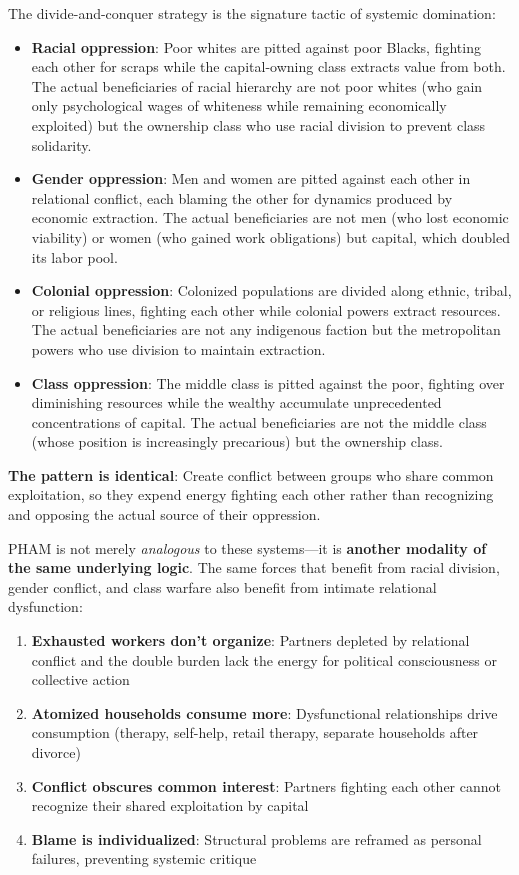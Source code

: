 \documentclass[12pt,openany]{book}
\numberwithin{equation}{chapter}
\begin{document}
The divide-and-conquer strategy is the signature tactic of systemic domination:

\begin{itemize}
    \item \textbf{Racial oppression}: Poor whites are pitted against poor Blacks, fighting each other for scraps while the capital-owning class extracts value from both. The actual beneficiaries of racial hierarchy are not poor whites (who gain only psychological wages of whiteness while remaining economically exploited) but the ownership class who use racial division to prevent class solidarity.
    
    \item \textbf{Gender oppression}: Men and women are pitted against each other in relational conflict, each blaming the other for dynamics produced by economic extraction. The actual beneficiaries are not men (who lost economic viability) or women (who gained work obligations) but capital, which doubled its labor pool.
    
    \item \textbf{Colonial oppression}: Colonized populations are divided along ethnic, tribal, or religious lines, fighting each other while colonial powers extract resources. The actual beneficiaries are not any indigenous faction but the metropolitan powers who use division to maintain extraction.
    
    \item \textbf{Class oppression}: The middle class is pitted against the poor, fighting over diminishing resources while the wealthy accumulate unprecedented concentrations of capital. The actual beneficiaries are not the middle class (whose position is increasingly precarious) but the ownership class.
\end{itemize}

\textbf{The pattern is identical}: Create conflict between groups who share common exploitation, so they expend energy fighting each other rather than recognizing and opposing the actual source of their oppression.

PHAM is not merely \textit{analogous} to these systems---it is \textbf{another modality of the same underlying logic}. The same forces that benefit from racial division, gender conflict, and class warfare also benefit from intimate relational dysfunction:

\begin{enumerate}
    \item \textbf{Exhausted workers don't organize}: Partners depleted by relational conflict and the double burden lack the energy for political consciousness or collective action
    \item \textbf{Atomized households consume more}: Dysfunctional relationships drive consumption (therapy, self-help, retail therapy, separate households after divorce)
    \item \textbf{Conflict obscures common interest}: Partners fighting each other cannot recognize their shared exploitation by capital
    \item \textbf{Blame is individualized}: Structural problems are reframed as personal failures, preventing systemic critique
\end{enumerate}
\end{document}
